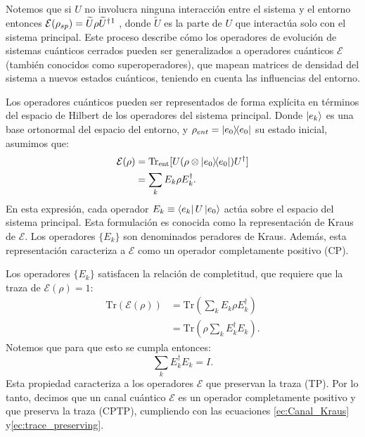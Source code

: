 \documentclass[letterpaper,12pt]{thesisECFM}
\theoremstyle{plain}
\theoremstyle{definition}
\theoremstyle{definition}
\theoremstyle{remark}
\newcommand{\1}{\mathbb{1}}
\begin{document}
Notemos que si $U$ no involucra ninguna interacción entre el sistema y el entorno entonces  $\mathcal{E}(\rho_{sp}) =  \widetilde{U} \rho \widetilde{U}^\dagger \footnotemark$ , donde $\widetilde{U}$ es la parte de $U$ que interactúa solo con el sistema principal. 
Este proceso describe cómo los operadores de evolución de sistemas cuánticos cerrados pueden ser generalizados a operadores cuánticos $\mathcal{E}$ (también conocidos como superoperadores), que mapean matrices de densidad del sistema a nuevos estados cuánticos, teniendo en cuenta las influencias del entorno.

Los operadores cuánticos pueden ser representados de forma explícita en términos del espacio de Hilbert de los operadores del sistema principal. Donde $\ket{e_k}$ es una base ortonormal del espacio del entorno, y $\rho_{ent} = \ketbra{e_0}$ su estado inicial, asumimos que:
\begin{align}
\mathcal{E}(\rho) &= \text{Tr}_{\text{ent}}[ U( \rho \otimes \ketbra{e_0} ) U^\dagger ] \\
&= \sum_k E_k \rho E_k^\dagger.  \label{ec:Canal_Kraus}
\end{align}
En esta expresión, cada operador $E_k \equiv \bra{e_k} U \ket{e_0}$ actúa sobre el espacio del sistema principal. Esta formulación es conocida como la representación de Kraus de $\mathcal{E}$. Los operadores $\{E_k\}$ son denominados peradores de Kraus. Además, esta representación caracteriza a $\mathcal{E}$ como un operador completamente positivo (CP).

Los operadores $\{E_k\}$  satisfacen la relación de completitud, que requiere que la traza de $\mathcal{E}(\rho) = 1$:
\begin{align}
    \text{Tr}(\mathcal{E}(\rho)) &= \text{Tr}\left(\sum_k E_k \rho E_k^\dagger\right) \\
    &= \text{Tr}\left(\rho \sum_k E_k^\dagger E_k \right).
\end{align}
Notemos que para que esto se cumpla entonces:
\begin{equation}
    \sum_k E_k^\dagger E_k = I. \label{ec:trace_preserving}
\end{equation}
Esta propiedad caracteriza a los operadores $\mathcal{E}$ que preservan la traza (TP). Por lo tanto, decimos que un canal cuántico $\mathcal{E}$ es un operador completamente positivo y  que preserva la traza (CPTP), cumpliendo con las ecuaciones \ref{ec:Canal_Kraus}  y\ref{ec:trace_preserving}. 
\end{document}
